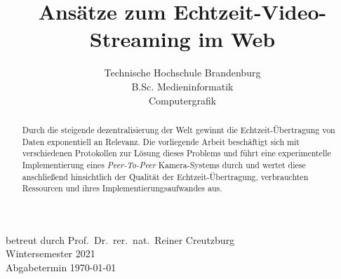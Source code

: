\documentclass{article}
\title{Ansätze zum Echtzeit-Video-Streaming im Web}
\author{
		Technische Hochschule Brandenburg \\
		B.Sc. Medieninformatik \\
		Computergrafik
}
\begin{document}
\begin{onecolumn}
	\begin{titlepage}

			betreut durch Prof.\ Dr.\ rer.\ nat.\ Reiner Creutzburg\\
			Wintersemester 2021\\
			Abgabetermin \today

		\maketitle

		\begin{abstract}
			Durch die steigende dezentralisierung der Welt gewinnt die
			Echtzeit-Übertragung von Daten exponentiell an Relevanz. Die
			vorliegende Arbeit beschäftigt sich mit verschiedenen Protokollen
			zur Lösung dieses Problems und führt eine experimentelle
			Implementierung eines \textit{Peer-To-Peer} Kamera-Systems durch
			und wertet diese anschließend hinsichtlich der Qualität der
			Echtzeit-Übertragung, verbrauchten Ressourcen und ihres
			Implementierungsaufwandes aus.
		\end{abstract}

		\tableofcontents

		\listoffigures
		\listoftables
	\end{titlepage}
\end{onecolumn}

\end{document}
